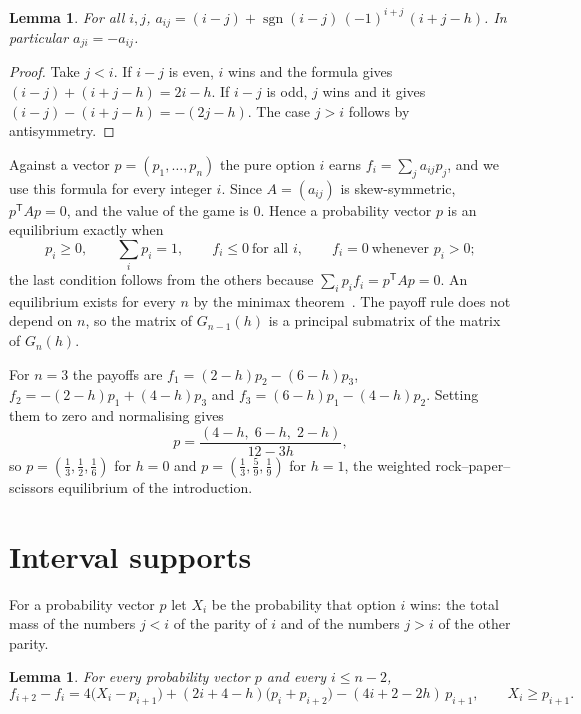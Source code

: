 \documentclass[11pt]{article}
\newtheorem{lemma}[theorem]{Lemma}
\theoremstyle{definition}
\theoremstyle{remark}
\DeclareMathOperator{\sgn}{sgn}
\begin{document}
\begin{lemma}\label{lem:payoff}
For all $i,j$,
$a_{ij}=(i-j)+\sgn(i-j)\,(-1)^{i+j}\,(i+j-h)$. In particular
$a_{ji}=-a_{ij}$.
\end{lemma}

\begin{proof}
Take $j<i$. If $i-j$ is even, $i$ wins and the formula gives
$(i-j)+(i+j-h)=2i-h$. If $i-j$ is odd, $j$ wins and it gives
$(i-j)-(i+j-h)=-(2j-h)$. The case $j>i$ follows by antisymmetry.
\end{proof}

Against a vector $p=(p_1,\dots,p_n)$ the pure option $i$ earns
$f_i=\sum_{j}a_{ij}p_j$, and we use this formula for every integer $i$.
Since $A=(a_{ij})$ is skew-symmetric, $p^{\mathsf T}Ap=0$, and the value of
the game is $0$. Hence a probability vector $p$ is an equilibrium exactly
when
\begin{equation}\label{eq:eq-conditions}
p_i\ge0,\qquad \sum_ip_i=1,\qquad f_i\le0\ \text{for all } i,\qquad
f_i=0\ \text{whenever } p_i>0;
\end{equation}
the last condition follows from the others because
$\sum_ip_if_i=p^{\mathsf T}Ap=0$. An equilibrium exists for every $n$ by
the minimax theorem~\cite{vN}. The payoff rule does not depend on $n$, so
the matrix of $G_{n-1}(h)$ is a principal submatrix of the matrix of
$G_n(h)$.

For $n=3$ the payoffs are $f_1=(2-h)p_2-(6-h)p_3$,
$f_2=-(2-h)p_1+(4-h)p_3$ and $f_3=(6-h)p_1-(4-h)p_2$. Setting them to
zero and normalising gives
\[
p=\frac{(4-h,\;6-h,\;2-h)}{12-3h},
\]
so $p=(\frac13,\frac12,\frac16)$ for $h=0$ and
$p=(\frac13,\frac59,\frac19)$ for $h=1$, the weighted
rock--paper--scissors equilibrium of the introduction.

\section{Interval supports}\label{sec:support}

For a probability vector $p$ let $X_i$ be the probability that option
$i$ wins: the total mass of the numbers $j<i$ of the parity of $i$ and of
the numbers $j>i$ of the other parity.

\begin{lemma}\label{lem:rows}
For every probability vector $p$ and every $i\le n-2$,
\[
f_{i+2}-f_i=4\bigl(X_i-p_{i+1}\bigr)+(2i+4-h)\bigl(p_i+p_{i+2}\bigr)
-(4i+2-2h)\,p_{i+1},\qquad X_i\ge p_{i+1}.
\]
\end{lemma}
\end{document}
